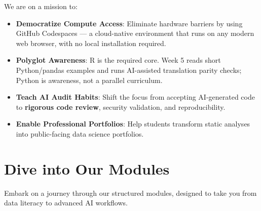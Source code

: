 \documentclass[
  letterpaper,
  DIV=11,
  numbers=noendperiod,
  oneside]{scrreprt}
\providecommand{\tightlist}{%
  \setlength{\itemsep}{0pt}\setlength{\parskip}{0pt}}
\begin{document}

We are on a mission to:

\begin{itemize}
\tightlist
\item
  \textbf{Democratize Compute Access}: Eliminate hardware barriers by
  using GitHub Codespaces --- a cloud-native environment that runs on
  any modern web browser, with no local installation required.
\item
  \textbf{Polyglot Awareness}: R is the required core. Week 5 reads
  short Python/pandas examples and runs AI-assisted translation parity
  checks; Python is awareness, not a parallel curriculum.
\item
  \textbf{Teach AI Audit Habits}: Shift the focus from accepting
  AI-generated code to \textbf{rigorous code review}, security
  validation, and reproducibility.
\item
  \textbf{Enable Professional Portfolios}: Help students transform
  static analyses into public-facing data science portfolios.
\end{itemize}

\section*{Dive into Our Modules}\label{dive-into-our-modules}


Embark on a journey through our structured modules, designed to take you
from data literacy to advanced AI workflows.
\end{document}
